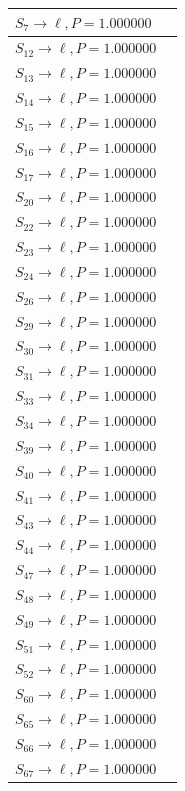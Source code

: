 \begin{tabular}{|l|c|}

\hline
$S_{7} \to \ell, P=1.000000$ & \\
\hline
$S_{12} \to \ell, P=1.000000$ & \\
\hline
$S_{13} \to \ell, P=1.000000$ & \\
\hline
$S_{14} \to \ell, P=1.000000$ & \\
\hline
$S_{15} \to \ell, P=1.000000$ & \\
\hline
$S_{16} \to \ell, P=1.000000$ & \\
\hline
$S_{17} \to \ell, P=1.000000$ & \\
\hline
$S_{20} \to \ell, P=1.000000$ & \\
\hline
$S_{22} \to \ell, P=1.000000$ & \\
\hline
$S_{23} \to \ell, P=1.000000$ & \\
\hline
$S_{24} \to \ell, P=1.000000$ & \\
\hline
$S_{26} \to \ell, P=1.000000$ & \\
\hline
$S_{29} \to \ell, P=1.000000$ & \\
\hline
$S_{30} \to \ell, P=1.000000$ & \\
\hline
$S_{31} \to \ell, P=1.000000$ & \\
\hline
$S_{33} \to \ell, P=1.000000$ & \\
\hline
$S_{34} \to \ell, P=1.000000$ & \\
\hline
$S_{39} \to \ell, P=1.000000$ & \\
\hline
$S_{40} \to \ell, P=1.000000$ & \\
\hline
$S_{41} \to \ell, P=1.000000$ & \\
\hline
$S_{43} \to \ell, P=1.000000$ & \\
\hline
$S_{44} \to \ell, P=1.000000$ & \\
\hline
$S_{47} \to \ell, P=1.000000$ & \\
\hline
$S_{48} \to \ell, P=1.000000$ & \\
\hline
$S_{49} \to \ell, P=1.000000$ & \\
\hline
$S_{51} \to \ell, P=1.000000$ & \\
\hline
$S_{52} \to \ell, P=1.000000$ & \\
\hline
$S_{60} \to \ell, P=1.000000$ & \\
\hline
$S_{65} \to \ell, P=1.000000$ & \\
\hline
$S_{66} \to \ell, P=1.000000$ & \\
\hline
$S_{67} \to \ell, P=1.000000$ & \\

\end{tabular}
